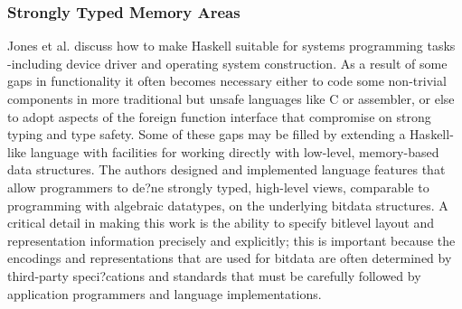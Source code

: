 \subsubsection{Strongly Typed Memory Areas}
Jones et al. \cite{5_4} discuss how to make Haskell suitable for systems programming tasks -including device driver and operating system construction. As a result of some gaps in functionality it often becomes necessary either to code some non-trivial components in more traditional but unsafe languages like C or assembler, or else to adopt aspects of the foreign function interface that compromise on strong typing and type safety. Some of these gaps may be filled by extending a Haskell-like language with facilities for working directly with low-level, memory-based data structures. The authors designed and implemented language features that allow programmers to de?ne strongly typed, high-level views, comparable to programming with algebraic datatypes, on the underlying bitdata structures. A critical detail in making this work is the ability to specify bitlevel layout and representation information precisely and explicitly; this is important because the encodings and representations that are used for bitdata are often determined by third-party speci?cations and standards that must be carefully followed by application programmers and language implementations.
